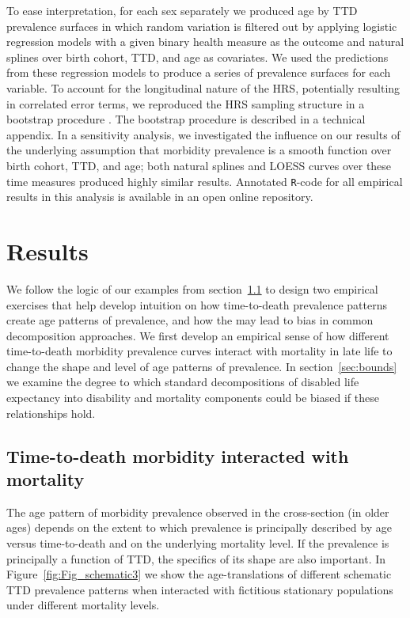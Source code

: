 \documentclass[12pt,oneside,a4paper]{article} %
\begin{document}
To ease interpretation, for each sex separately we produced age by TTD prevalence surfaces in which
random variation is filtered out by applying logistic regression models with a
given binary health measure as the outcome and natural splines over birth cohort,
TTD, and age as covariates. We used the predictions from these regression models
to produce a series of prevalence surfaces for each variable. To account for the
longitudinal nature of the HRS, potentially resulting in correlated error terms,
we reproduced the HRS sampling structure in a bootstrap procedure
\citep{efron1994introduction}. The bootstrap procedure is described in a technical appendix. In a sensitivity analysis, we investigated the influence on our results of the underlying assumption that morbidity prevalence is a smooth function over birth cohort, TTD, and age; both natural splines and LOESS curves over these time measures \citep{riffe2017ttd} produced highly similar results. Annotated \texttt{R}-code for all empirical results in this analysis is available in an open online repository.
% 

\section{Results}
\label{sec:ttdok}
We follow the logic of our examples from section~\ref{sec:schematic} to design two empirical exercises that help develop intuition on how time-to-death prevalence patterns create age patterns of prevalence, and how the may lead to bias in common decomposition approaches. We first develop an empirical sense of how different time-to-death morbidity prevalence curves interact with mortality in late life to change the shape and level of age patterns of prevalence. In section~\ref{sec:bounds} we examine the degree to which standard decompositions of disabled life expectancy into disability and mortality components could be biased if these relationships hold.
\FloatBarrier
\subsection{Time-to-death morbidity interacted with mortality}
\label{sec:schematic}
The age pattern of morbidity prevalence observed in the cross-section (in older ages) depends
on the extent to which prevalence is principally described by
age versus time-to-death and on the underlying mortality
level. If the prevalence is principally a function of TTD, the
specifics of its shape are also important. In Figure~\ref{fig:Fig_schematic3} we
show the age-translations of different schematic TTD prevalence patterns when
interacted with fictitious stationary populations under different mortality levels.
\end{document}
